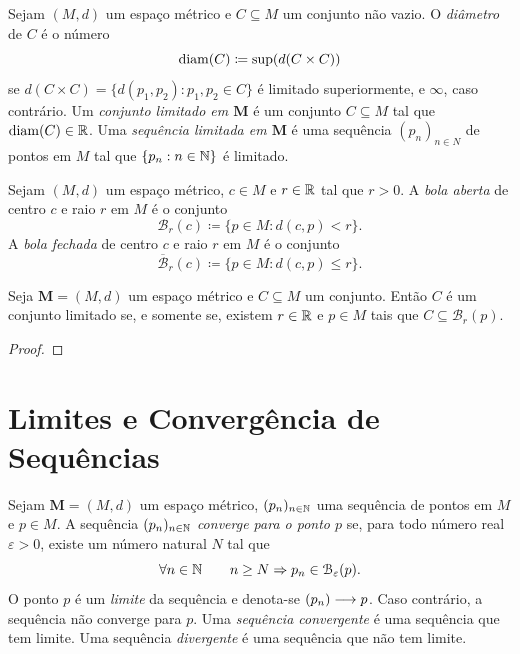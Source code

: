\begin{defi}
	Sejam $(M,d)$ um espaço métrico e $C \subseteq M$ um conjunto não vazio. O \emph{diâmetro} de $C$ é o número
	\begin{equation*}
	\diam(C) \coloneqq \sup (d(C \times C))
	\end{equation*}
se $d(C \times C) = \{d(p_1,p_2) : p_1,p_2 \in C\}$ é limitado superiormente, e $\infty$, caso contrário. Um \emph{conjunto limitado em $\bm M$} é um conjunto $C \subseteq M$ tal que $\operatorname{diam}(C) \in \mathbb{R}$. Uma \emph{sequência limitada em $\bm M$} é uma sequência $(p_n)_{n \in N}$ de pontos em $M$ tal que $\{p_n : n \in \mathbb{N}\}$ é limitado.
\end{defi}

\begin{defi}
	Sejam $(M,d)$ um espaço métrico, $c \in M$ e $r \in \mathbb{R}$ tal que $r>0$. A \emph{bola aberta} de centro $c$ e raio $r$ em $M$ é o conjunto
	\begin{equation*}
	\mathcal B_{r}(c) \coloneqq \{p \in M : d(c,p) < r\}.
	\end{equation*}
A \emph{bola fechada} de centro $c$ e raio $r$ em $M$ é o conjunto
	\begin{equation*}
	\overline {\mathcal B}_r(c) \coloneqq \{p \in M : d(c,p) \leq r\}.
	\end{equation*}
\end{defi}

\begin{prop}
	Seja $\bm M = (M,d)$ um espaço métrico e $C \subseteq M$ um conjunto. Então $C$ é um conjunto limitado se, e somente se, existem $r \in \mathbb{R}$ e $p \in M$ tais que $C \subseteq \mathcal B_r(p)$.
\end{prop}
\begin{proof}

\end{proof}



\section{Limites e Convergência de Sequências}

\begin{defi}
	Sejam $\bm M = (M,d)$ um espaço métrico, $(p_n)_{n \in \mathbb{N}}$ uma sequência de pontos em $M$ e $p \in M$. A sequência $(p_n)_{n \in \mathbb{N}}$  \emph{converge para o ponto $p$} se, para todo número real $\varepsilon > 0$, existe um número natural $N$ tal que
	\begin{equation*}
	\forall n \in \mathbb{N} \qquad n \geq N \Rightarrow p_n \in \mathcal B_\varepsilon(p).
	\end{equation*}
O ponto $p$ é um \emph{limite} da sequência e denota-se $(p_n) \longrightarrow p$. Caso contrário, a sequência não converge para $p$. Uma \emph{sequência convergente} é uma sequência que tem limite. Uma sequência \emph{divergente} é uma sequência que não tem limite.
\end{defi}

